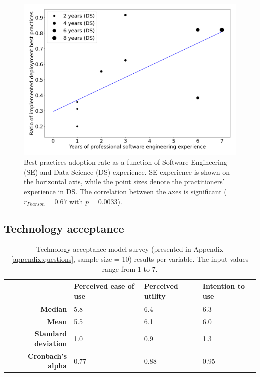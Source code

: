 \begin{figure}
    \centering
    \includegraphics[width=0.6\linewidth]{figures/best-practices.png}
    \captionsetup{width=.9\linewidth}
    \caption{Best practices adoption rate as a function of Software Engineering (SE) and Data Science (DS) experience. SE experience is shown on the horizontal axis, while the point sizes denote the practitioners' experience in DS. The correlation between the axes is significant ($r_{Pearson} = 0.67$ with $p = 0.0033$).}
    \label{fig:adoption}
\end{figure}

\subsection{Technology acceptance}

\begin{table}[H]
\centering
\captionsetup{width=.9\linewidth}
\caption{Technology acceptance model survey (presented in Appendix \ref{appendix:questions}, sample size = 10) results per variable. The input values range from 1 to 7.}
\label{table:tam}
{\renewcommand{\arraystretch}{1.1} %
\begin{tabular}{|r|l|l|l|} \hline
                            & \textbf{Perceived ease of use} & \textbf{Perceived utility} & \textbf{Intention to use} \\\hline
\textbf{Median}             & 5.8                          & 6.4                      & 6.3                     \\\hline
\textbf{Mean}               & 5.5                          & 6.1                      & 6.0                     \\\hline
\textbf{Standard deviation} & 1.0                          & 0.9                      & 1.3                     \\\hline
\textbf{Cronbach's alpha}   & 0.77                         & 0.88                     & 0.95                     \\\hline
\end{tabular}}
\end{table}

